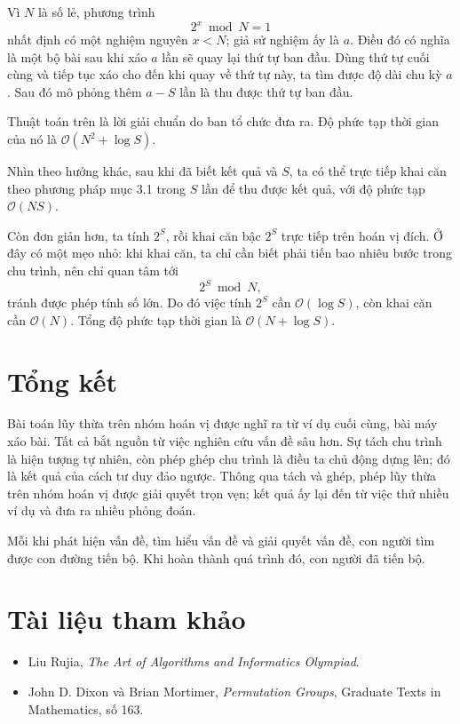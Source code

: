 \documentclass[11pt]{article}
\newcommand{\Oh}{\mathcal{O}}
\begin{document}
Vì \(N\) là số lẻ, phương trình
\[
  2^x\bmod N=1
\]
nhất định có một nghiệm nguyên \(x<N\); giả sử nghiệm ấy là \(a\). Điều đó có
nghĩa là một bộ bài sau khi xáo \(a\) lần sẽ quay lại thứ tự ban đầu. Dùng thứ
tự cuối cùng và tiếp tục xáo cho đến khi quay về thứ tự này, ta tìm được độ
dài chu kỳ \(a\). Sau đó mô phỏng thêm \(a-S\) lần là thu được thứ tự ban đầu.

Thuật toán trên là lời giải chuẩn do ban tổ chức đưa ra. Độ phức tạp thời gian
của nó là \(\Oh(N^2+\log S)\).

Nhìn theo hướng khác, sau khi đã biết kết quả và \(S\), ta có thể trực tiếp
khai căn theo phương pháp mục 3.1 trong \(S\) lần để thu được kết quả, với độ
phức tạp \(\Oh(NS)\).

Còn đơn giản hơn, ta tính \(2^S\), rồi khai căn bậc \(2^S\) trực tiếp trên
hoán vị đích. Ở đây có một mẹo nhỏ: khi khai căn, ta chỉ cần biết phải tiến
bao nhiêu bước trong chu trình, nên chỉ quan tâm tới
\[
  2^S\bmod N,
\]
tránh được phép tính số lớn. Do đó việc tính \(2^S\) cần \(\Oh(\log S)\), còn
khai căn cần \(\Oh(N)\). Tổng độ phức tạp thời gian là
\(\Oh(N+\log S)\).

\section{Tổng kết}

Bài toán lũy thừa trên nhóm hoán vị được nghĩ ra từ ví dụ cuối cùng, bài máy
xáo bài. Tất cả bắt nguồn từ việc nghiên cứu vấn đề sâu hơn. Sự tách chu trình
là hiện tượng tự nhiên, còn phép ghép chu trình là điều ta chủ động dựng lên;
đó là kết quả của cách tư duy đảo ngược. Thông qua tách và ghép, phép lũy
thừa trên nhóm hoán vị được giải quyết trọn vẹn; kết quả ấy lại đến từ việc
thử nhiều ví dụ và đưa ra nhiều phỏng đoán.

Mỗi khi phát hiện vấn đề, tìm hiểu vấn đề và giải quyết vấn đề, con người tìm
được con đường tiến bộ. Khi hoàn thành quá trình đó, con người đã tiến bộ.

\section*{Tài liệu tham khảo}

\begin{itemize}
  \item Liu Rujia, \emph{The Art of Algorithms and Informatics Olympiad}.
  \item John D. Dixon và Brian Mortimer, \emph{Permutation Groups}, Graduate
  Texts in Mathematics, số 163.
\end{itemize}
\end{document}
